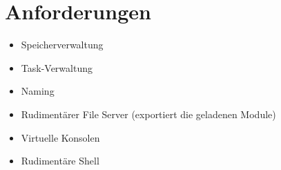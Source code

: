 \section{Anforderungen}

\begin{itemize}
	\item Speicherverwaltung
	\item Task-Verwaltung
	\item Naming
	\item Rudimentärer File Server (exportiert die geladenen Module)
	\item Virtuelle Konsolen
	\item Rudimentäre Shell
\end{itemize}